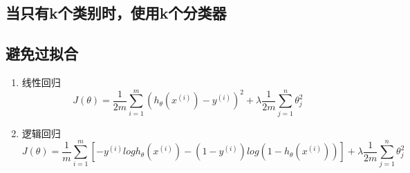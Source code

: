 \subsection{当只有k个类别时，使用k个分类器}

\subsection{避免过拟合}
\begin{enumerate}
\item 线性回归
\begin{equation}
	J(\theta) = \frac{1}{2m}\sum_{i=1}^m (h_\theta(x^{(i)})-y^{(i)})^2 + \lambda \frac{1}{2m} \sum_{j=1}^n\theta_j^2
\end{equation}

\item 逻辑回归
\begin{equation}
	J(\theta) = \frac{1}{m}
	    \sum_{i=1}^m \left[ -y^{(i)}log{h_\theta(x^{(i)})} - (1-y^{(i)})log{(1-h_\theta(x^{(i)}))} \right]
		+ \lambda \frac{1}{2m} \sum_{j=1}^n\theta_j^2
\end{equation}
\end{enumerate}







